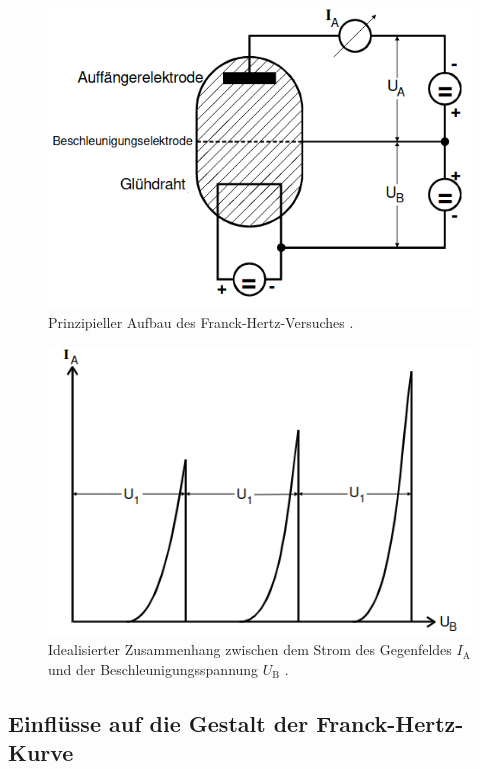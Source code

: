     \begin{figure}
         \centering 
         \includegraphics[width=\textwidth]{bilder/prinzipieller_aufbau.png}
         \caption{Prinzipieller Aufbau des Franck-Hertz-Versuches \cite{anleitung}.}
         \label{fig:prinzipieller_aufbau}
    \end{figure}

    \begin{figure}
        \centering 
        \includegraphics[width=\textwidth]{bilder/idealer_Ub_Ia.png}
        \caption{Idealisierter Zusammenhang zwischen dem Strom des Gegenfeldes $I_{\text{A}}$ und der Beschleunigungsspannung $U_{\text{B}}$ \cite{anleitung}. }
        \label{fig:idealisiert}
    \end{figure}

\subsection{Einflüsse auf die Gestalt der Franck-Hertz-Kurve}

